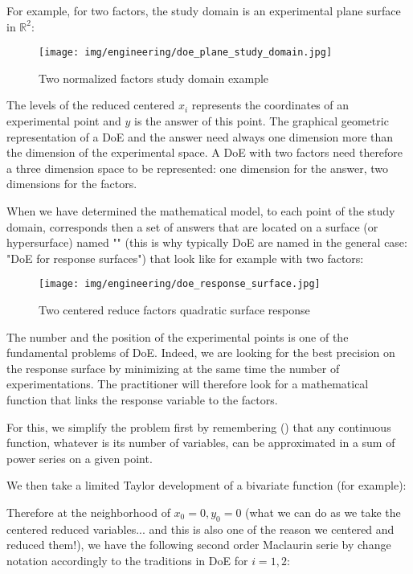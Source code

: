 	For example, for two factors, the study domain is an experimental plane surface in $\mathbb{R}^2$:
	\begin{figure}[H]
		\begin{center}
		\texttt{[image: img/engineering/doe\_plane\_study\_domain.jpg]}
		\end{center}	
		\caption{Two normalized factors study domain example}
	\end{figure}
	The levels of the reduced centered $x_i$  represents the coordinates of an experimental point and $y$ is the answer of this point. The graphical geometric representation of a DoE and the answer need always one dimension more than the dimension of the experimental space. A DoE with two factors need therefore a three dimension space to be represented: one dimension for the answer, two dimensions for the factors.

	When we have determined the mathematical model, to each point of the study domain, corresponds then a set of answers that are located on a surface (or hypersurface) named "" (this is why typically DoE are named in the general case: "DoE for response surfaces") that look like for example with two factors:
	\begin{figure}[H]
		\begin{center}
		\texttt{[image: img/engineering/doe\_response\_surface.jpg]}
		\end{center}	
		\caption{Two centered reduce factors quadratic surface response}
	\end{figure}
	The number and the position of the experimental points is one of the fundamental problems of DoE. Indeed, we are looking for the best precision on the response surface by minimizing at the same time the number of experimentations. The practitioner will therefore look for a mathematical function that links the response variable to the factors.
	
	For this, we simplify the problem first by remembering () that any continuous function, whatever is its number of variables, can be approximated in a sum of power series on a given point.

	We then take a limited Taylor development of a bivariate function (for example):
	
	Therefore at the neighborhood of $x_0=0,y_0=0$ (what we can do as we take the centered reduced variables... and this is also one of the reason we centered and reduced them!), we have the following second order Maclaurin serie by change notation accordingly to the traditions in DoE for $i=1,2$:
	
